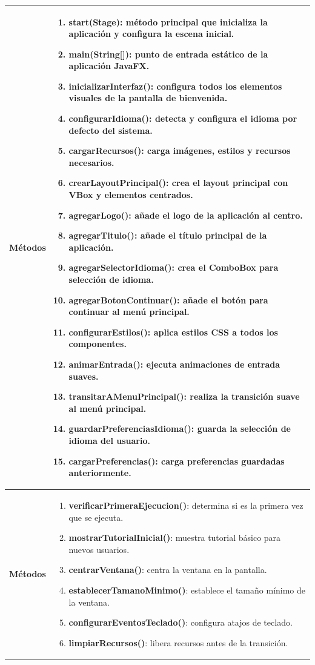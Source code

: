 \begin{longtable}[H]{|>{\columncolor[rgb]{0.63,0.79,0.95}}m{6cm} | m{8.5cm} |}
\textbf{Métodos} & \begin{enumerate}
 		\item \textbf{start(Stage)}: método principal que inicializa la aplicación y configura la escena inicial.
 		\item \textbf{main(String[])}: punto de entrada estático de la aplicación JavaFX.
 		\item \textbf{inicializarInterfaz()}: configura todos los elementos visuales de la pantalla de bienvenida.
 		\item \textbf{configurarIdioma()}: detecta y configura el idioma por defecto del sistema.
 		\item \textbf{cargarRecursos()}: carga imágenes, estilos y recursos necesarios.
 		\item \textbf{crearLayoutPrincipal()}: crea el layout principal con VBox y elementos centrados.
 		\item \textbf{agregarLogo()}: añade el logo de la aplicación al centro.
 		\item \textbf{agregarTitulo()}: añade el título principal de la aplicación.
 		\item \textbf{agregarSelectorIdioma()}: crea el ComboBox para selección de idioma.
 		\item \textbf{agregarBotonContinuar()}: añade el botón para continuar al menú principal.
 		\item \textbf{configurarEstilos()}: aplica estilos CSS a todos los componentes.
 		\item \textbf{animarEntrada()}: ejecuta animaciones de entrada suaves.
 		\item \textbf{transitarAMenuPrincipal()}: realiza la transición suave al menú principal.
 		\item \textbf{guardarPreferenciasIdioma()}: guarda la selección de idioma del usuario.
 		\item \textbf{cargarPreferencias()}: carga preferencias guardadas anteriormente.
\end{enumerate} \\ \hline

\textbf{Métodos} & \begin{enumerate}
 		\item \textbf{verificarPrimeraEjecucion()}: determina si es la primera vez que se ejecuta.
 		\item \textbf{mostrarTutorialInicial()}: muestra tutorial básico para nuevos usuarios.
 		\item \textbf{centrarVentana()}: centra la ventana en la pantalla.
 		\item \textbf{establecerTamanoMinimo()}: establece el tamaño mínimo de la ventana.
 		\item \textbf{configurarEventosTeclado()}: configura atajos de teclado.
 		\item \textbf{limpiarRecursos()}: libera recursos antes de la transición.
\end{enumerate}                                 

 \label{tabla99}

\end{longtable}

